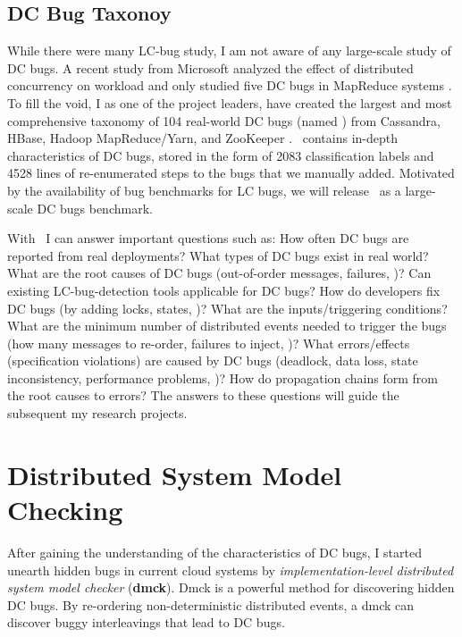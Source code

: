\documentclass[11pt]{article}
\begin{document}
\subsection{DC Bug Taxonoy} 

While there were many LC-bug study, I am not aware of any large-scale study of
DC bugs. A recent study from Microsoft analyzed the effect of distributed
concurrency on workload and only studied five DC bugs in MapReduce systems
\cite{Xiao+14-NonDetMR}. To fill the void, I as one of the project leaders,
have created the largest and most comprehensive taxonomy of 104 real-world DC
bugs (named \taxdc) from Cassandra, HBase, Hadoop MapReduce/Yarn, and ZooKeeper
\cite{Gunawi+16-TaxDc-Appear}. \taxdc\ contains in-depth characteristics of DC
bugs, stored in the form of 2083 classification labels and 4528 lines of
re-enumerated steps to the bugs that we manually added. Motivated by the
availability of bug benchmarks for LC bugs, we will release \taxdc\ as a
large-scale DC bugs benchmark.

With \taxdc\, I can answer important questions such as: How often DC bugs are
reported from real deployments? What types of DC bugs exist in real world?
What are the root causes of DC bugs (out-of-order messages, failures, \etc)?
Can existing LC-bug-detection tools applicable for DC bugs? How do developers
fix DC bugs (by adding locks, states, \etc)? What are the inputs/triggering
conditions?  What are the minimum number of distributed events needed to
trigger the bugs (how many messages to re-order, failures to inject, \etc)?
What errors/effects (specification violations) are caused by DC bugs (deadlock,
data loss, state inconsistency, performance problems, \etc)? How do propagation
chains form from the root causes to errors? The answers to these questions will
guide the subsequent my research projects.

\section{Distributed System Model Checking}

After gaining the understanding of the characteristics of DC bugs, I started
unearth hidden bugs in current cloud systems by \textit{implementation-level
distributed system model checker} (\textbf{dmck}). Dmck is a powerful method for
discovering hidden DC bugs. By re-ordering non-deterministic distributed events,
a dmck can discover buggy interleavings that lead to DC bugs.
\fi
\end{document}
